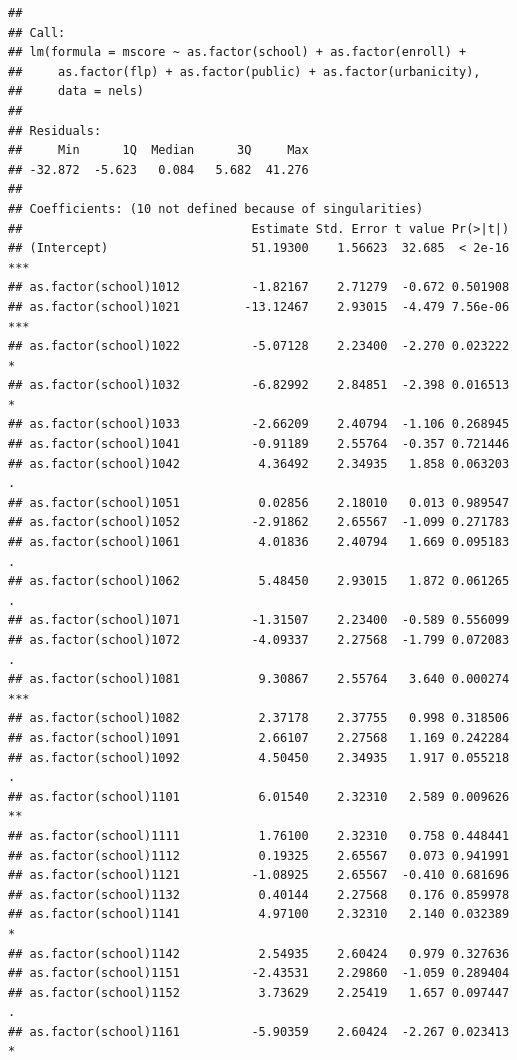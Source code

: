 \documentclass[ignorenonframetext,]{beamer}
\begin{document}
\begin{frame}[fragile]{}

\begin{verbatim}
## 
## Call:
## lm(formula = mscore ~ as.factor(school) + as.factor(enroll) + 
##     as.factor(flp) + as.factor(public) + as.factor(urbanicity), 
##     data = nels)
## 
## Residuals:
##     Min      1Q  Median      3Q     Max 
## -32.872  -5.623   0.084   5.682  41.276 
## 
## Coefficients: (10 not defined because of singularities)
##                                Estimate Std. Error t value Pr(>|t|)    
## (Intercept)                    51.19300    1.56623  32.685  < 2e-16 ***
## as.factor(school)1012          -1.82167    2.71279  -0.672 0.501908    
## as.factor(school)1021         -13.12467    2.93015  -4.479 7.56e-06 ***
## as.factor(school)1022          -5.07128    2.23400  -2.270 0.023222 *  
## as.factor(school)1032          -6.82992    2.84851  -2.398 0.016513 *  
## as.factor(school)1033          -2.66209    2.40794  -1.106 0.268945    
## as.factor(school)1041          -0.91189    2.55764  -0.357 0.721446    
## as.factor(school)1042           4.36492    2.34935   1.858 0.063203 .  
## as.factor(school)1051           0.02856    2.18010   0.013 0.989547    
## as.factor(school)1052          -2.91862    2.65567  -1.099 0.271783    
## as.factor(school)1061           4.01836    2.40794   1.669 0.095183 .  
## as.factor(school)1062           5.48450    2.93015   1.872 0.061265 .  
## as.factor(school)1071          -1.31507    2.23400  -0.589 0.556099    
## as.factor(school)1072          -4.09337    2.27568  -1.799 0.072083 .  
## as.factor(school)1081           9.30867    2.55764   3.640 0.000274 ***
## as.factor(school)1082           2.37178    2.37755   0.998 0.318506    
## as.factor(school)1091           2.66107    2.27568   1.169 0.242284    
## as.factor(school)1092           4.50450    2.34935   1.917 0.055218 .  
## as.factor(school)1101           6.01540    2.32310   2.589 0.009626 ** 
## as.factor(school)1111           1.76100    2.32310   0.758 0.448441    
## as.factor(school)1112           0.19325    2.65567   0.073 0.941991    
## as.factor(school)1121          -1.08925    2.65567  -0.410 0.681696    
## as.factor(school)1132           0.40144    2.27568   0.176 0.859978    
## as.factor(school)1141           4.97100    2.32310   2.140 0.032389 *  
## as.factor(school)1142           2.54935    2.60424   0.979 0.327636    
## as.factor(school)1151          -2.43531    2.29860  -1.059 0.289404    
## as.factor(school)1152           3.73629    2.25419   1.657 0.097447 .  
## as.factor(school)1161          -5.90359    2.60424  -2.267 0.023413 *  

\end{verbatim}
\end{frame}
\end{document}
